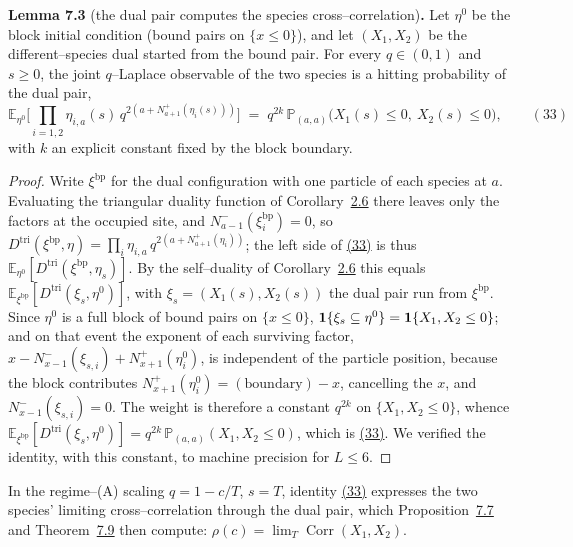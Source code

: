 \documentclass[11pt]{article}
\theoremstyle{plain}
\theoremstyle{definition}
\theoremstyle{remark}
\DeclareMathOperator{\Corr}{Corr}\DeclareMathOperator{\cum}{cum}
\newcommand{\E}{\mathbb{E}}\newcommand{\PP}{\mathbb{P}}\newcommand{\dd}{\,\mathrm{d}}
\begin{document}
\label{lem_crossbridge}\noindent\textbf{Lemma 7.3} (the dual pair computes the species cross--correlation)\textbf{.} 
Let $\eta^0$ be the block initial condition (bound pairs on $\{x\le0\}$), and let
$(X_1,X_2)$ be the different--species dual started from the bound pair. For every
$q\in(0,1)$ and $s\ge0$, the joint $q$--Laplace observable of the two species is a
hitting probability of the dual pair,
\label{eq_crossbridge}
\begin{equation}
  \E_{\eta^0}\Big[\textstyle\prod_{i=1,2}\eta_{i,a}(s)\,
     q^{2\left(a+N^+_{a+1}(\eta_i(s))\right)}\Big]
   \;=\; q^{2k}\,\PP_{(a,a)}\big(X_1(s)\le0,\ X_2(s)\le0\big),\qquad(33)
\end{equation}
with $k$ an explicit constant fixed by the block boundary.
\par
\begin{proof}
Write $\xi^{\mathrm{bp}}$ for the dual configuration with one particle of each species at
$a$. Evaluating the triangular duality function of Corollary~\hyperref[cor_tri]{2.6} there leaves
only the factors at the occupied site, and $N^-_{a-1}(\xi^{\mathrm{bp}}_i)=0$, so
$D^{\mathrm{tri}}(\xi^{\mathrm{bp}},\eta)=\prod_i\eta_{i,a}\,q^{2(a+N^+_{a+1}(\eta_i))}$;
the left side of \hyperref[eq_crossbridge]{(33)} is thus
$\E_{\eta^0}[D^{\mathrm{tri}}(\xi^{\mathrm{bp}},\eta_s)]$. By the self--duality of
Corollary~\hyperref[cor_tri]{2.6} this equals $\E_{\xi^{\mathrm{bp}}}[D^{\mathrm{tri}}(\xi_s,\eta^0)]$,
with $\xi_s=(X_1(s),X_2(s))$ the dual pair run from $\xi^{\mathrm{bp}}$. Since $\eta^0$ is
a full block of bound pairs on $\{x\le0\}$, $\mathbf 1\{\xi_s\subseteq\eta^0\}=\mathbf 1\{X_1,X_2\le0\}$;
and on that event the exponent of each surviving factor,
$x-N^-_{x-1}(\xi_{s,i})+N^+_{x+1}(\eta^0_i)$, is independent of the particle position,
because the block contributes $N^+_{x+1}(\eta^0_i)=(\text{boundary})-x$, cancelling the
$x$, and $N^-_{x-1}(\xi_{s,i})=0$. The weight is therefore a constant $q^{2k}$ on
$\{X_1,X_2\le0\}$, whence
$\E_{\xi^{\mathrm{bp}}}[D^{\mathrm{tri}}(\xi_s,\eta^0)]=q^{2k}\,\PP_{(a,a)}(X_1,X_2\le0)$,
which is \hyperref[eq_crossbridge]{(33)}. We verified the identity, with this constant, to machine
precision for $L\le6$.
\end{proof}

In the regime--(A) scaling $q=1-c/T$, $s=T$, identity \hyperref[eq_crossbridge]{(33)} expresses the
two species' limiting cross--correlation through the dual pair, which
Proposition~\hyperref[prop_twophase]{7.7} and Theorem~\hyperref[thm_closed]{7.9} then compute:
$\rho(c)=\lim_T\Corr(X_1,X_2)$.
\end{document}
